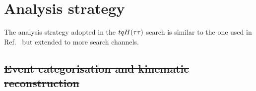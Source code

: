 \documentclass[PAPER, coverpage, atlasdraft=true, texlive=2016, UKenglish]{\ATLASLATEXPATH atlasdoc}
\providecommand{\DIFdel}[1]{{\protect\color{red}\sout{#1}}}                      %
\providecommand{\DIFdelbegin}{} %
\begin{document}



\section{Analysis strategy}
\label{sec:strategy_Htautau}

The analysis strategy adopted in the $tqH(\tau\tau)$ search is similar to the one used in Ref.~\cite{fcnc36,Chen:2015nta} but extended to more search channels.
\DIFdelbegin %

\subsection{\DIFdel{Event categorisation and kinematic reconstruction}}
\addtocounter{subsection}{-1}%
\end{document}
